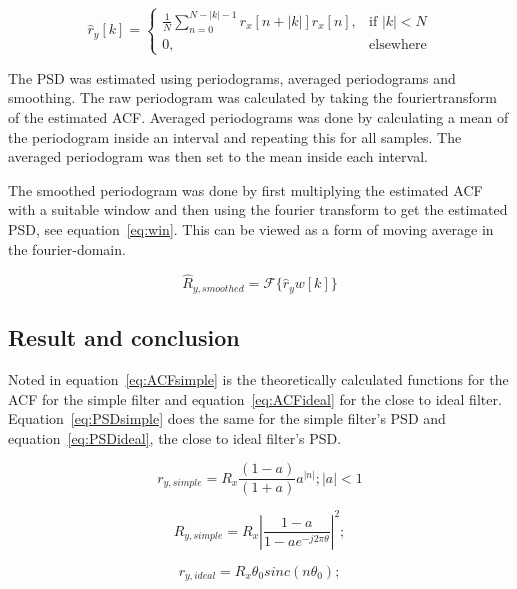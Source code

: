 \documentclass[10pt]{article}
\begin{document}
\begin{equation}
\label{eq:Blett}
\hat{r}_y[k] =
\begin{cases}
    \frac{1}{N}\sum_{n=0}^{N-|k|-1}r_x[n+|k|]r_x[n],& \text{if } |k|< N\\
    0,              & \text{elsewhere}
\end{cases}
\end{equation}

The PSD was estimated using periodograms, averaged periodograms
and smoothing. The raw periodogram was calculated by taking the fouriertransform
of the estimated ACF.
Averaged periodograms was done by calculating a mean of the periodogram inside
an interval and repeating this for all samples. The averaged periodogram was
then set to the mean inside each interval.

The smoothed periodogram was done by first multiplying the estimated ACF with a
 suitable window and then using the fourier transform to get the estimated PSD,
 see equation~\ref{eq:win}. This can be viewed as a form of moving average in the fourier-domain.

 \begin{equation}
 \label{eq:win}
 \hat{R}_{y,smoothed} = \mathcal{F}\{\hat{r}_yw[k]\}
 \end{equation}



\subsection{Result and conclusion}

Noted in equation~\ref{eq:ACFsimple} is the theoretically calculated functions
for the ACF for the simple filter and equation~\ref{eq:ACFideal} for the close
to ideal filter.
Equation~\ref{eq:PSDsimple} does the same for the simple filter's PSD
and equation~\ref{eq:PSDideal}, the close to ideal filter's PSD.

\begin{equation}
  \label{eq:ACFsimple}
  r_{y,simple} = R_x\frac{(1-a)}{(1+a)}a^{|n|};  |a| < 1
\end{equation}

\begin{equation}
  \label{eq:PSDsimple}
  R_{y,simple} =  R_x|\frac{1-a}{1-ae^{-j2\pi\theta}}|^2;
\end{equation}

\begin{equation}
  \label{eq:ACFideal}
  r_{y,ideal} = R_x\theta_{0}sinc(n\theta_0);
\end{equation}
\end{document}
